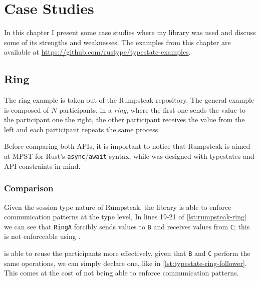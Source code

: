 

\chapter{Case Studies}\label{cha:case-study}

In this chapter I present some case studies where my library was used and discuss some of its strengths and weaknesses.
The examples from this chapter are available at \url{https://github.com/rustype/typestate-examples}.

\section{Ring}

The ring example is taken out of the Rumpsteak \autocite{Cutner2021} repository.
The general example is composed of $N$ participants, in a \emph{ring},
where the first one sends the value to the participant one the right,
the other participant receives the value from the left and each participant repeats the same process.


Before comparing both APIs, it is important to notice that Rumpsteak is aimed at \gls{MPST}
for Rust's \texttt{async}/\texttt{await} syntax,
while  was designed with typestates and API constraints in mind.

\subsection{Comparison}

Given the session type nature of Rumpsteak, the library is able to enforce communication patterns at the type level,
In lines 19-21 of \autoref{lst:rumpsteak-ring} we can see that \texttt{RingA} forcibly sends values to \texttt{B} and receives values from \texttt{C};
this is not enforceable using .

 is able to reuse the participants more effectively,
given that \texttt{B} and \texttt{C} perform the same operations, we can simply declare one,
like in \autoref{lst:typestate-ring-follower}.
This comes at the cost of not being able to enforce communication patterns.

